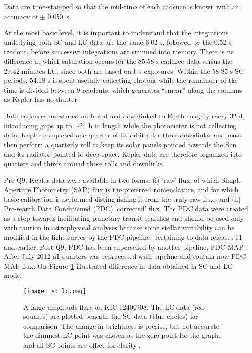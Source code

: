 Data are time-stamped so that the mid-time of each cadence
is known with an accuracy of $\pm$ 0.050~s.

At the most basic level, it is important to understand that the
integrations underlying both SC and LC data are the same 6.02 s,
followed by the 0.52 s readout, before successive integrations
are summed into memory. There is no difference at which
saturation occurs for the 85.58 s cadence data versus the
29.42 minutes LC, since both are based on 6 s exposures.
Within the 58.85 s SC periods, 54.18 s is spent usefully
collecting photons while the remainder of the time is divided
between 9 readouts, which generates “smear” along the columns
as Kepler has no shutter \citep{gilliland2010}

Both cadences are stored on-board and downlinked to Earth roughly every 32 d, 
introducing gaps up to $\sim$24 h in length while the photometer is not collecting data.
Kepler completed one quarter of its orbit after three downlinks, and
must then perform a quarterly roll to keep its solar panels pointed
towards the Sun and its radiator pointed to deep space. Kepler data
are therefore organized into quarters and thirds around those rolls
and downlinks.

Pre-Q9, Kepler data were available in two forms: (i) 'raw' flux,
of which Simple Aperture Photometry (SAP) flux is the preferred
nomenclature, and for which basic calibration is performed distinguishing
it from the truly raw flux, and (ii) Pre-search Data
Conditioned (PDC) 'corrected' flux. The PDC data were created
as a step towards facilitating planetary transit searches and should
be used only with caution in astrophysical analyses because some
stellar variability can be modified in the light curves by the PDC
pipeline, pertaining to data releases 11 and earlier.
Post-Q9, PDC has been superseded by another pipeline, PDC MAP \citep{Murphy2012}. 
After July 2012 all quarters was reprocessed with pipeline and contain now PDC MAP flux.
On Figure \ref{fig_sclc} illustrated difference in data obtained in SC and LC mode. 

\begin{figure}[!t]
\vspace{0cm}
\centerline{\texttt{[image: sc\_lc.png]}}
\caption{A large-amplitude flare on KIC 12406908. The LC data (red squares) are 
plotted beneath the SC data (blue circles) for comparison. 
The change in brightness is precise, but not accurate – the dimmest LC point was
chosen as the zero-point for the graph, and all SC points are offset for clarity \citep{Murphy2012}.}
\label{fig_sclc}
\end{figure}

